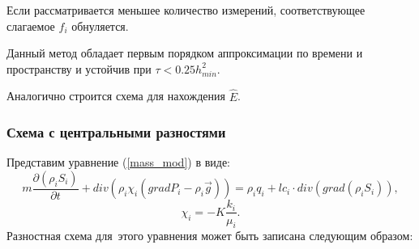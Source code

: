 Если рассматривается меньшее количество измерений,
соответствующее слагаемое $f_i$ обнуляется.

Данный метод обладает первым порядком аппроксимации по времени
и пространству и устойчив при $\tau < 0.25 h_{min}^2$.

Аналогично строится схема для нахождения $\widehat{E}$.

\subsubsection*{Схема с центральными разностями}

Представим уравнение (\ref{mass_mod}) в виде:
 \begin{equation}
 	 m \frac{\partial (\rho_i S_i)}{\partial t}+ div(\rho_i \chi_i (grad P_i - {\rho}_i\overrightarrow{g})) = \rho_i q_i + l c_i \cdot div(grad(\rho_i S_i)),
 \end{equation}
 $$\chi_i=-K\frac{k_i}{\mu_i}.$$
Разностная схема для~этого уравнения может быть записана следующим
образом:

